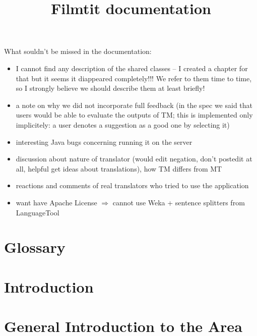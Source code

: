 \documentclass[11pt, oneside]{book}
\title{Filmtit documentation}
\author{}
\begin{document}

{\huge What souldn't be missed in the documentation:
\begin{itemize}

\item I cannot find any description of the shared classes -- I created a chapter for that but it seems it diappeared completely!!! We refer to them time to time, so I strongly believe we should describe them at least briefly!

\item a note on why we did not incorporate full feedback (in the spec we said that users would be able to evaluate the outputs of TM; this is implemented only implicitely: a user denotes a suggestion as a good one by selecting it)

\item interesting Java bugs concerning running it on the server

\item discussion about nature of translator (would edit negation, don't postedit at all, helpful get ideas about translations), how TM differs from MT

\item reactions and comments of real translators who tried to use the application

\item want have Apache License $\Rightarrow$ cannot use Weka + sentence splitters from LanguageTool

\end{itemize}
}

\newpage


\tableofcontents
\sloppy

\newpage

\setcounter{page}{1}

\chapter*{Glossary}



\chapter{Introduction}


\chapter{General Introduction to the Area}

\end{document}
